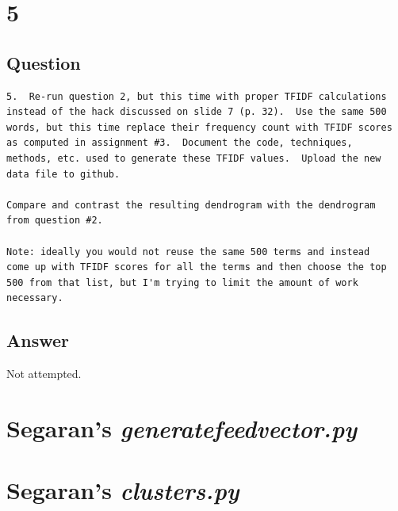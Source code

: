 \documentclass[letterpaper,11pt]{article}
\begin{document}
\clearpage



\clearpage

\newpage

\section*{5}

\subsection*{Question}

\begin{verbatim}
5.  Re-run question 2, but this time with proper TFIDF calculations
instead of the hack discussed on slide 7 (p. 32).  Use the same 500
words, but this time replace their frequency count with TFIDF scores
as computed in assignment #3.  Document the code, techniques,
methods, etc. used to generate these TFIDF values.  Upload the new
data file to github.

Compare and contrast the resulting dendrogram with the dendrogram
from question #2.

Note: ideally you would not reuse the same 500 terms and instead
come up with TFIDF scores for all the terms and then choose the top
500 from that list, but I'm trying to limit the amount of work
necessary.
\end{verbatim}

\subsection*{Answer}
Not attempted.


\clearpage
\appendix
\section{Segaran's \emph{generatefeedvector.py}}



\clearpage
\section{Segaran's \emph{clusters.py}}




\clearpage


\end{document}
